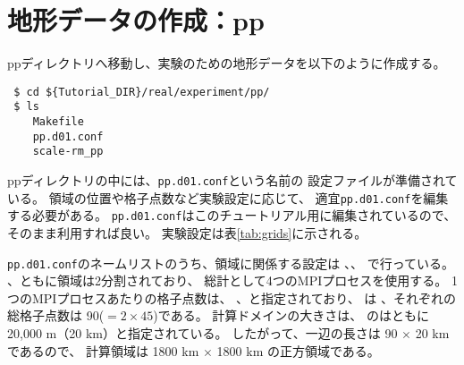 \section{地形データの作成：pp} \label{sec:tutrial_real_pp}

ppディレクトリへ移動し、実験のための地形データを以下のように作成する。
\begin{verbatim}
 $ cd ${Tutorial_DIR}/real/experiment/pp/
 $ ls
    Makefile
    pp.d01.conf
    scale-rm_pp
\end{verbatim}
ppディレクトリの中には、\verb|pp.d01.conf|という名前の
設定ファイルが準備されている。
領域の位置や格子点数など実験設定に応じて、
適宜\verb|pp.d01.conf|を編集する必要がある。
\verb|pp.d01.conf|はこのチュートリアル用に編集されているので、
そのまま利用すれば良い。
実験設定は表\ref{tab:grids}に示される。

\verb|pp.d01.conf|のネームリストのうち、領域に関係する設定は
、、
で行っている。
{\XDIR} 、{\YDIR}ともに領域は2分割されており、
総計として4つのMPIプロセスを使用する。
1つのMPIプロセスあたりの格子点数は、
、と指定されており、
は{\XDIR} 、{\YDIR}それぞれの総格子点数は 90($=2 \times 45$)である。
計算ドメインの大きさは、
のはともに20,000 m（20 km）と指定されている。
したがって、一辺の長さは 90 $\times$ 20 km であるので、
計算領域は 1800 km $\times$ 1800 km の正方領域である。\\

